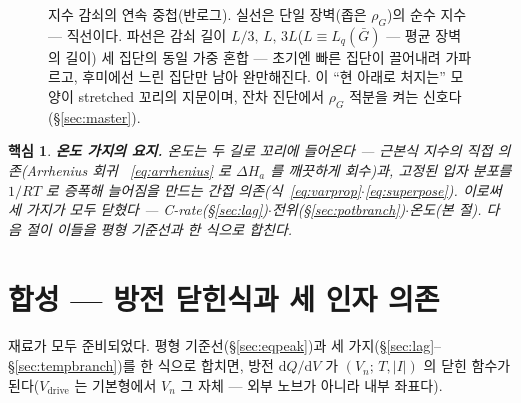 \documentclass[11pt,a4paper]{article}
\newtheorem*{keybox}{핵심}
\newcommand{\dd}{\mathrm{d}}
\newcommand{\drive}{\mathrm{drive}}
\begin{document}
\begin{figure}[t]
\centering
{}
\caption{지수 감쇠의 연속 중첩(반로그). 실선은 단일 장벽(좁은 $\rho_G$)의 순수 지수 — 직선이다. 파선은
감쇠 길이 $L/3,\,L,\,3L$($L\equiv L_q(\bar G)$ — 평균 장벽의 길이) 세 집단의 동일 가중 혼합 —
초기엔 빠른 집단이 끌어내려 가파르고, 후미에선 느린 집단만 남아 완만해진다. 이 ``현 아래로 처지는'' 모양이 stretched 꼬리의 지문이며, 잔차 진단에서
$\rho_G$ 적분을 켜는 신호다(\S\ref{sec:master}).}
\label{fig:superpose}
\end{figure}

\begin{keybox}
\textbf{온도 가지의 요지.} 온도는 두 길로 꼬리에 들어온다 — 근본식 지수의 직접 의존(Arrhenius 회귀
~\eqref{eq:arrhenius} 로 $\Delta H_a$ 를 깨끗하게 회수)과, 고정된 입자 분포를 $1/RT$ 로 증폭해 늘어짐을
만드는 간접 의존(식~\eqref{eq:varprop}$\cdot$\eqref{eq:superpose}). 이로써 세 가지가 모두 닫혔다 —
C-rate(\S\ref{sec:lag})$\cdot$전위(\S\ref{sec:potbranch})$\cdot$온도(본 절). 다음 절이 이들을 평형
기준선과 한 식으로 합친다.
\end{keybox}

\section{합성 — 방전 닫힌식과 세 인자 의존}\label{sec:synth}
재료가 모두 준비되었다. 평형 기준선(\S\ref{sec:eqpeak})과 세 가지(\S\ref{sec:lag}--
\S\ref{sec:tempbranch})를 한 식으로 합치면, 방전 $\dd Q/\dd V$ 가 $(V_n;\,T,|I|)$ 의 닫힌 함수가
된다($V_\drive$ 는 기본형에서 $V_n$ 그 자체 — 외부 노브가 아니라 내부 좌표다).
\end{document}

